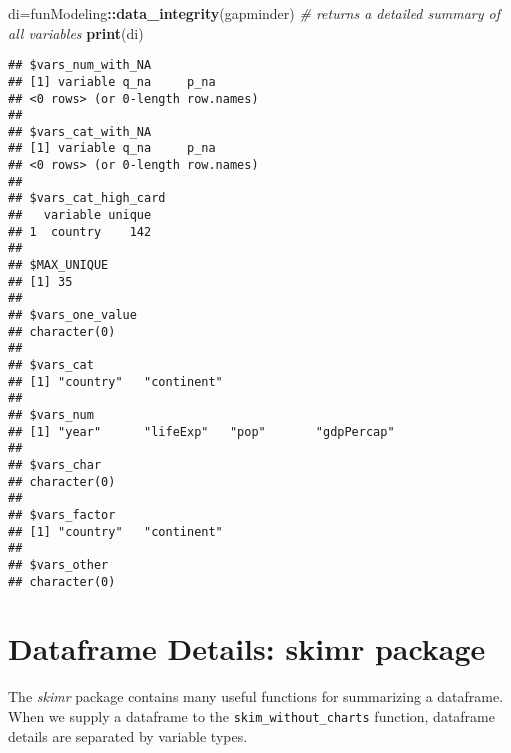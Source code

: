 \documentclass[]{book}
\newenvironment{Shaded}{\begin{snugshade}}{\end{snugshade}}
\newcommand{\KeywordTok}[1]{\textcolor[rgb]{0.13,0.29,0.53}{\textbf{#1}}}
\newcommand{\StringTok}[1]{\textcolor[rgb]{0.31,0.60,0.02}{#1}}
\newcommand{\CommentTok}[1]{\textcolor[rgb]{0.56,0.35,0.01}{\textit{#1}}}
\newcommand{\OperatorTok}[1]{\textcolor[rgb]{0.81,0.36,0.00}{\textbf{#1}}}
\newcommand{\NormalTok}[1]{#1}
\begin{document}
\begin{Shaded}
\begin{Highlighting}[]
\NormalTok{di=funModeling}\OperatorTok{::}\KeywordTok{data_integrity}\NormalTok{(gapminder)}
\CommentTok{# returns a detailed summary of all variables}
\KeywordTok{print}\NormalTok{(di)}
\end{Highlighting}
\end{Shaded}

\begin{verbatim}
## $vars_num_with_NA
## [1] variable q_na     p_na    
## <0 rows> (or 0-length row.names)
## 
## $vars_cat_with_NA
## [1] variable q_na     p_na    
## <0 rows> (or 0-length row.names)
## 
## $vars_cat_high_card
##   variable unique
## 1  country    142
## 
## $MAX_UNIQUE
## [1] 35
## 
## $vars_one_value
## character(0)
## 
## $vars_cat
## [1] "country"   "continent"
## 
## $vars_num
## [1] "year"      "lifeExp"   "pop"       "gdpPercap"
## 
## $vars_char
## character(0)
## 
## $vars_factor
## [1] "country"   "continent"
## 
## $vars_other
## character(0)
\end{verbatim}

\section{Dataframe Details: skimr
package}\label{dataframe-details-skimr-package}

The \emph{skimr} package contains many useful functions for summarizing
a dataframe. When we supply a dataframe to the
\texttt{skim\_without\_charts} function, dataframe details are separated
by variable types.

\begin{Shaded}
\end{Shaded}
\end{document}
